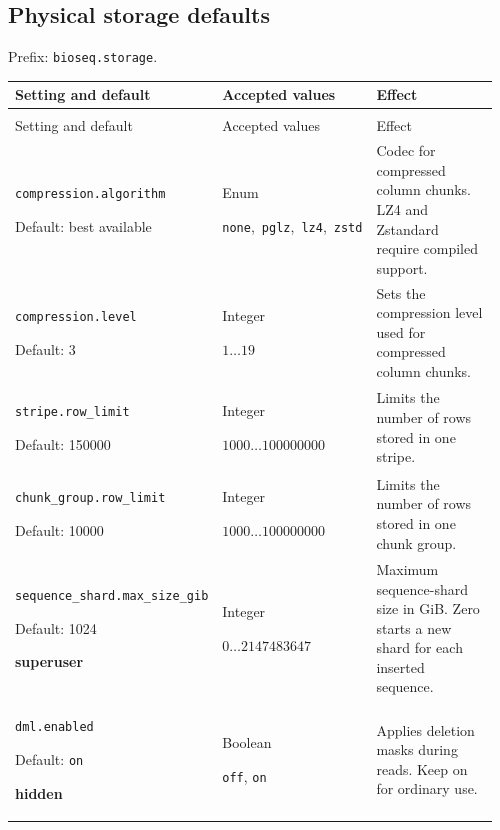 \subsection{Physical storage defaults}

Prefix: \nolinkurl{bioseq.storage}.

\begingroup
\small
\setlength{\tabcolsep}{4pt}
\renewcommand{\arraystretch}{1.16}
\begin{longtable}{@{}>{\raggedright\arraybackslash}p{0.34\linewidth}>{\raggedright\arraybackslash}p{0.22\linewidth}>{\raggedright\arraybackslash}p{0.40\linewidth}@{}}
\toprule
Setting and default & Accepted values & Effect \\
\midrule
\endfirsthead
\multicolumn{3}{@{}l}{Prefix: \nolinkurl{bioseq.storage} (continued)} \\
\toprule
Setting and default & Accepted values & Effect \\
\midrule
\endhead
\bottomrule
\endfoot
\nolinkurl{compression.algorithm}\par Default: best available & Enum\par \nolinkurl{none},\allowbreak\ \nolinkurl{pglz},\allowbreak\ \nolinkurl{lz4},\allowbreak\ \nolinkurl{zstd} & Codec for compressed column chunks. LZ4 and Zstandard require compiled support. \\[4pt]
\nolinkurl{compression.level}\par Default: 3 & Integer\par $1\ldots 19$ & Sets the compression level used for compressed column chunks. \\[4pt]
\nolinkurl{stripe.row_limit}\par Default: 150000 & Integer\par $1000\ldots 100000000$ & Limits the number of rows stored in one stripe. \\[4pt]
\nolinkurl{chunk_group.row_limit}\par Default: 10000 & Integer\par $1000\ldots 100000000$ & Limits the number of rows stored in one chunk group. \\[4pt]
\nolinkurl{sequence_shard.max_size_gib}\par Default: 1024\par \textbf{superuser} & Integer\par $0\ldots 2147483647$ & Maximum sequence-shard size in GiB. Zero starts a new shard for each inserted sequence. \\[4pt]
\nolinkurl{dml.enabled}\par Default: \texttt{on}\par \textbf{hidden} & Boolean\par \texttt{off}, \texttt{on} & Applies deletion masks during reads. Keep on for ordinary use. \\[4pt]
\end{longtable}
\endgroup

